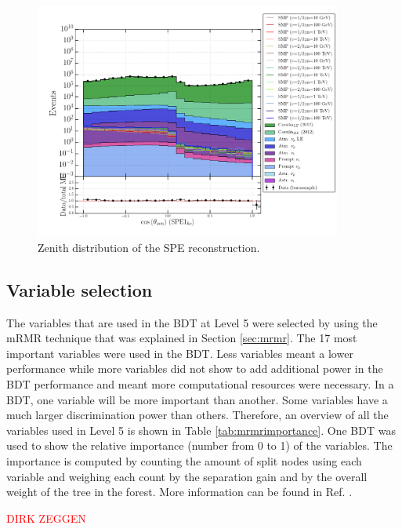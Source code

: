 \begin{figure}
\centering
\includegraphics[width=0.9\textwidth]{chapter8/img/1D_stack_spefit1_hc_coszenith_foefelare}
\caption{Zenith distribution of the SPE reconstruction.}
\label{fig:remainingvariableszenith}
\end{figure}




\subsection{Variable selection}
The variables that are used in the BDT at Level 5 were selected by using the mRMR technique that was explained in Section \ref{sec:mrmr}. The 17 most important variables were used in the BDT. Less variables meant a lower performance while more variables did not show to add additional power in the BDT performance and meant more computational resources were necessary. In a BDT, one variable will be more important than another. Some variables have a much larger discrimination power than others. Therefore, an overview of all the variables used in Level 5 is shown in Table \ref{tab:mrmrimportance}. One BDT was used to show the relative importance (number from 0 to 1) of the variables. The importance is computed by counting the amount of split nodes using each
variable and weighing each count by the separation gain and by the overall weight of the tree in the forest. More information can be found in Ref. \cite{pybdturl}.

\textcolor{red}{DIRK ZEGGEN}

